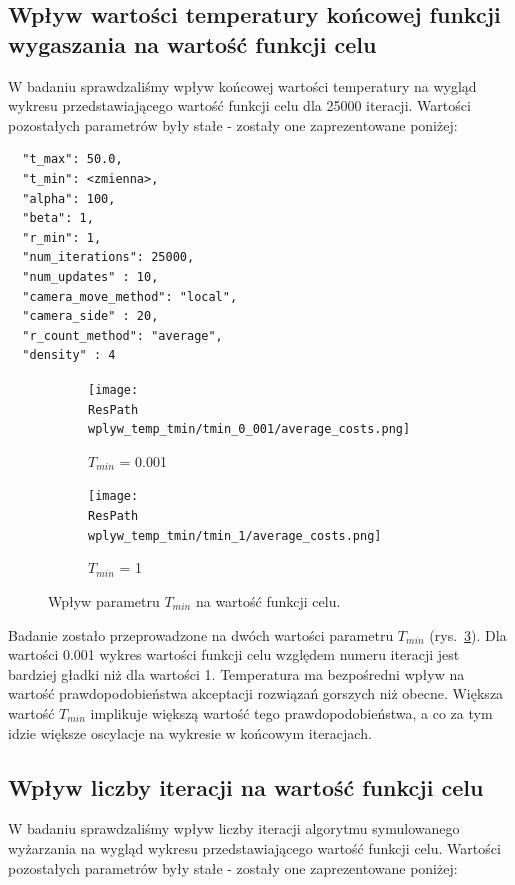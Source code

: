 \documentclass[12pt,a4paper]{article}
\newcommand{\ResPath}{../badania/}
\begin{document}
\subsection{Wpływ wartości temperatury końcowej funkcji wygaszania na wartość
funkcji celu}
W badaniu sprawdzaliśmy wpływ końcowej wartości temperatury na wygląd wykresu
przedstawiającego wartość funkcji celu dla 25000 iteracji. Wartości pozostałych
parametrów były stałe - zostały one zaprezentowane poniżej:

\begin{lstlisting}
  "t_max": 50.0,
  "t_min": <zmienna>,
  "alpha": 100,
  "beta": 1,
  "r_min": 1,
  "num_iterations": 25000,
  "num_updates" : 10,
  "camera_move_method": "local",
  "camera_side" : 20,
  "r_count_method": "average",
  "density" : 4
\end{lstlisting}
\begin{figure}[htb]
  \begin{subfigure}[b]{0.5\linewidth}
    \centering
    \texttt{[image: \\ResPath wplyw\_temp\_tmin/tmin\_0\_001/average\_costs.png]} 
    \caption{$T_{min}$ = 0.001} 
    \label{fig_tmin:a} 
    \vspace{2ex}
  \end{subfigure}%
  \begin{subfigure}[b]{0.5\linewidth}
    \texttt{[image: \\ResPath wplyw\_temp\_tmin/tmin\_1/average\_costs.png]} 
    \caption{$T_{min}$ = 1} 
    \label{fig_tmin:b} 
    \vspace{2ex}
  \end{subfigure} 
  \caption{Wpływ parametru $T_{min}$ na wartość funkcji celu.}
  \label{fig_tmin} 
\end{figure}
\newpage
Badanie zostało przeprowadzone na dwóch wartości parametru $T_{min}$
(rys.\ \ref{fig_tmin}).
Dla wartości 0.001 wykres wartości funkcji celu względem numeru iteracji
jest bardziej gładki niż dla wartości 1. Temperatura ma bezpośredni wpływ na wartość
prawdopodobieństwa akceptacji rozwiązań gorszych niż obecne. Większa wartość $T_{min}$
implikuje większą wartość tego prawdopodobieństwa, a co za tym idzie większe oscylacje na wykresie w końcowym iteracjach.

\subsection{Wpływ liczby iteracji na wartość funkcji celu}
W badaniu sprawdzaliśmy wpływ liczby iteracji algorytmu symulowanego wyżarzania
na wygląd wykresu przedstawiającego wartość funkcji celu.
Wartości pozostałych parametrów były stałe - zostały one zaprezentowane poniżej:
\end{document}

